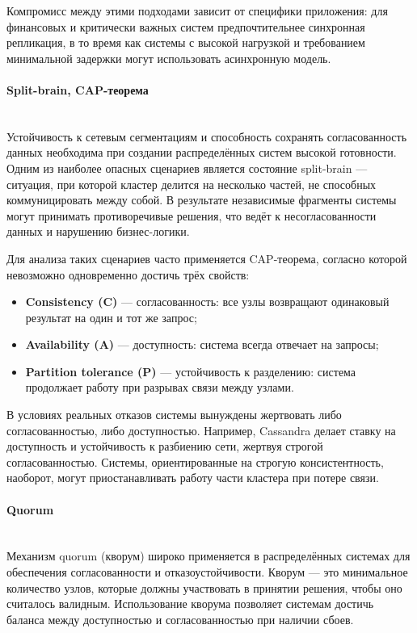 Компромисс между этими подходами зависит от специфики приложения: для финансовых и критически важных систем предпочтительнее синхронная репликация, в то время как системы с высокой нагрузкой и требованием минимальной задержки могут использовать асинхронную модель.

\paragraph{Split-brain, CAP-теорема} ~\\

Устойчивость к сетевым сегментациям и способность сохранять согласованность данных необходима при создании распределённых систем высокой готовности. Одним из наиболее опасных сценариев является состояние split-brain — ситуация, при которой кластер делится на несколько частей, не способных коммуницировать между собой. В результате независимые фрагменты системы могут принимать противоречивые решения, что ведёт к несогласованности данных и нарушению бизнес-логики. \autocite{Kleppmann}

Для анализа таких сценариев часто применяется CAP-теорема, согласно которой невозможно одновременно достичь трёх свойств:
\begin{itemize}
    \item \textbf{Consistency (C)} — согласованность: все узлы возвращают одинаковый результат на один и тот же запрос;
    \item \textbf{Availability (A)} — доступность: система всегда отвечает на запросы;
    \item \textbf{Partition tolerance (P)} — устойчивость к разделению: система продолжает работу при разрывах связи между узлами.
\end{itemize}

В условиях реальных отказов системы вынуждены жертвовать либо согласованностью, либо доступностью. Например, Cassandra делает ставку на доступность и устойчивость к разбиению сети, жертвуя строгой согласованностью. Системы, ориентированные на строгую консистентность, наоборот, могут приостанавливать работу части кластера при потере связи.

\paragraph{Quorum} ~\\

Механизм quorum (кворум) широко применяется в распределённых системах для обеспечения согласованности и отказоустойчивости. Кворум — это минимальное количество узлов, которые должны участвовать в принятии решения, чтобы оно считалось валидным. Использование кворума позволяет системам достичь баланса между доступностью и согласованностью при наличии сбоев. \autocite{Kleppmann}

